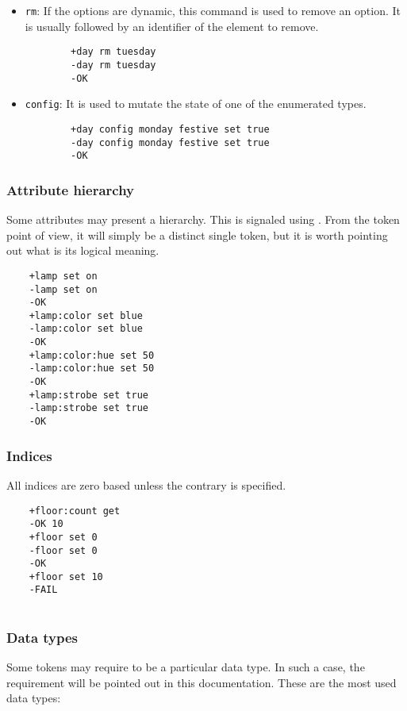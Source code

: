 \documentclass[../main.tex]{subfiles}
\begin{document}
\begin{itemize}
    \item \texttt{rm}: If the options are dynamic, this command is used to remove an option. It is usually followed by an identifier of the element to remove.
    
    \begin{lstlisting}
        +day rm tuesday
        -day rm tuesday
        -OK
    \end{lstlisting}
    
    \item \texttt{config}: It is used to mutate the state of one of the enumerated types.
    
    \begin{lstlisting}
        +day config monday festive set true
        -day config monday festive set true
        -OK
    \end{lstlisting}
    
    
\end{itemize}

\subsubsection{Attribute hierarchy}
Some attributes may present a hierarchy. This is signaled using \textquote{:}. From the token point of view, it will simply be a distinct single token, but it is worth pointing out what is its logical meaning.

\begin{lstlisting}
    +lamp set on
    -lamp set on
    -OK
    +lamp:color set blue
    -lamp:color set blue
    -OK
    +lamp:color:hue set 50
    -lamp:color:hue set 50
    -OK
    +lamp:strobe set true
    -lamp:strobe set true
    -OK
\end{lstlisting}

\subsubsection{Indices}
All indices are zero based unless the contrary is specified.

\begin{lstlisting}
    +floor:count get
    -OK 10
    +floor set 0
    -floor set 0
    -OK
    +floor set 10
    -FAIL
    
\end{lstlisting}
    
\subsubsection{Data types}
Some tokens may require to be a particular data type. In such a case, the requirement will be pointed out in this documentation. These are the most used data types:
\end{document}
